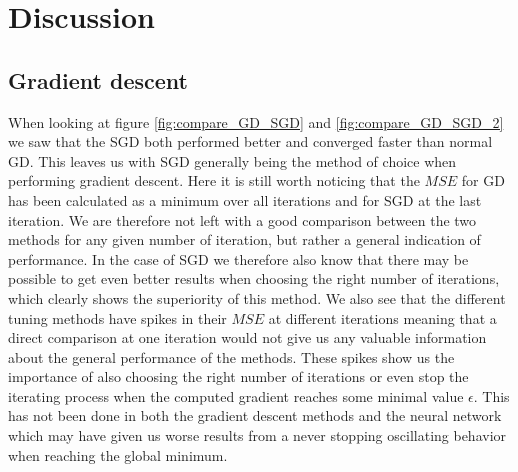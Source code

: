 \documentclass[11pt]{article}
\begin{document}
\section{Discussion}
\subsection{Gradient descent}
When looking at figure \ref{fig:compare_GD_SGD} and \ref{fig:compare_GD_SGD_2} we saw that the SGD both performed better and converged faster than normal GD. This leaves us with SGD generally being the method of choice when performing gradient descent. Here it is still worth noticing that the $MSE$ for GD has been calculated as a minimum over all iterations and for SGD at the last iteration. We are therefore not left with a good comparison between the two methods for any given number of iteration, but rather a general indication of performance. In the case of SGD we therefore also know that there may be possible to get even better results when choosing the right number of iterations, which clearly shows the superiority of this method.
We also see that the different tuning methods have spikes in their $MSE$ at different iterations meaning that a direct comparison at one iteration would not give us any valuable information about the general performance of the methods. These spikes show us the importance of also choosing the right number of iterations or even stop the iterating process when the computed gradient reaches some minimal value $\epsilon$. This has not been done in both the gradient descent methods and the neural network which may have given us worse results from a never stopping oscillating behavior when reaching the global minimum.
\end{document}
